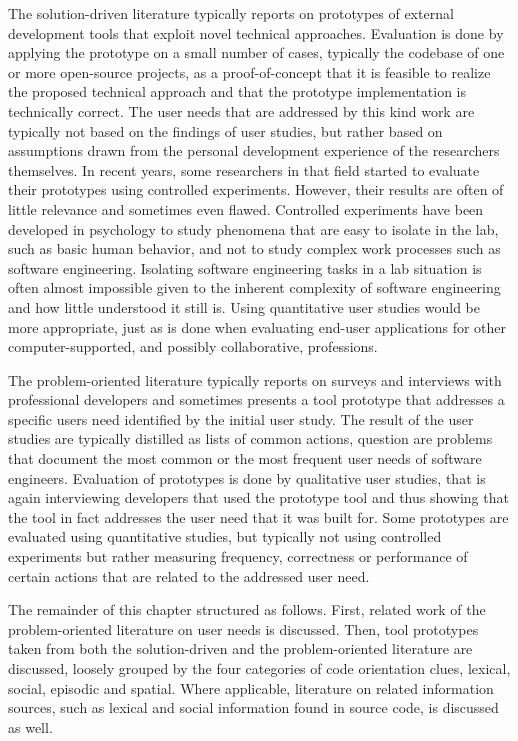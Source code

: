 The solution-driven literature typically reports on prototypes of external development tools that exploit novel technical approaches. Evaluation is done by applying the prototype on a small number of cases, typically the codebase of one or more open-source projects, as a proof-of-concept that it is feasible to realize the proposed technical approach and that the prototype implementation is technically correct. The user needs that are addressed by this kind work are typically not based on the findings of user studies, but rather based on assumptions drawn from the personal development experience of the researchers themselves. In recent years, some researchers in that field started to evaluate their prototypes using controlled experiments. However, their results are often of little relevance and sometimes even flawed. Controlled experiments have been developed in psychology to study phenomena that are easy to isolate in the lab, such as basic human behavior, and not to study complex work processes such as software engineering. Isolating software engineering tasks in a lab situation is often almost impossible given to the inherent complexity of software engineering and how little understood it still is. Using quantitative user studies would be more appropriate, just as is done when evaluating end-user applications for other computer-supported, and possibly collaborative, professions.

The problem-oriented literature typically reports on surveys and interviews with professional developers and sometimes presents a tool prototype that addresses a specific users need identified by the initial user study. The result of the user studies are typically distilled as lists of common actions, question are problems that document the most common or the most frequent user needs of software engineers. Evaluation of prototypes is done by qualitative user studies, that is again interviewing developers that used the prototype tool and thus showing that the tool in fact addresses the user need that it was built for. Some prototypes are evaluated using quantitative studies, but typically not using controlled experiments but rather measuring frequency, correctness or performance of certain actions that are related to the addressed user need.

\asteriskasteriskasterisk

The remainder of this chapter structured as follows. First, related work of the problem-oriented literature on user needs is discussed. Then, tool prototypes taken from both the solution-driven and the problem-oriented literature are discussed, loosely grouped by the four categories of code orientation clues, \ie lexical, social, episodic and spatial. Where applicable, literature on related information sources, such as \eg lexical and social information found in source code, is discussed as well.

